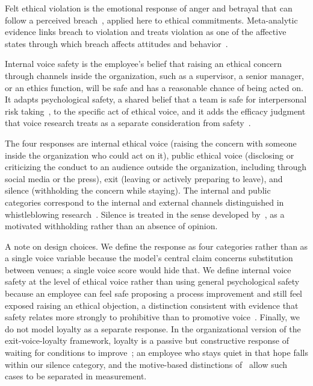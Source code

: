 \documentclass[12pt,a4paper]{article}
\theoremstyle{definition}
\begin{document}
Felt ethical violation is the emotional response of anger and betrayal that can follow a perceived breach~\citep{morrison1997employees}, applied here to ethical commitments. Meta-analytic evidence links breach to violation and treats violation as one of the affective states through which breach affects attitudes and behavior~\citep{zhao2007impact}.

Internal voice safety is the employee's belief that raising an ethical concern through channels inside the organization, such as a supervisor, a senior manager, or an ethics function, will be safe and has a reasonable chance of being acted on. It adapts psychological safety, a shared belief that a team is safe for interpersonal risk taking~\citep{edmondson1999psychological}, to the specific act of ethical voice, and it adds the efficacy judgment that voice research treats as a separate consideration from safety~\citep{morrison2014employee}.

The four responses are internal ethical voice (raising the concern with someone inside the organization who could act on it), public ethical voice (disclosing or criticizing the conduct to an audience outside the organization, including through social media or the press), exit (leaving or actively preparing to leave), and silence (withholding the concern while staying). The internal and public categories correspond to the internal and external channels distinguished in whistleblowing research~\citep{dworkin1998internal,kaptein2011inaction}. Silence is treated in the sense developed by~\citet{vandyne2003conceptualizing}, as a motivated withholding rather than an absence of opinion.

A note on design choices. We define the response as four categories rather than as a single voice variable because the model's central claim concerns substitution between venues; a single voice score would hide that. We define internal voice safety at the level of ethical voice rather than using general psychological safety because an employee can feel safe proposing a process improvement and still feel exposed raising an ethical objection, a distinction consistent with evidence that safety relates more strongly to prohibitive than to promotive voice~\citep{liang2012psychological}. Finally, we do not model loyalty as a separate response. In the organizational version of the exit-voice-loyalty framework, loyalty is a passive but constructive response of waiting for conditions to improve~\citep{farrell1983exit}; an employee who stays quiet in that hope falls within our silence category, and the motive-based distinctions of~\citet{vandyne2003conceptualizing} allow such cases to be separated in measurement.
\end{document}
